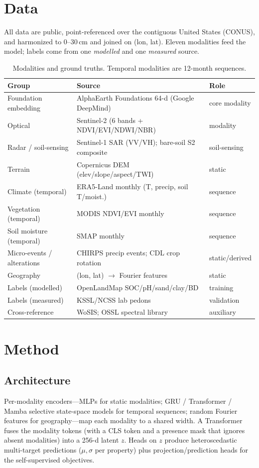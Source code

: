 \documentclass[11pt]{article}
\begin{document}
\section{Data}
All data are public, point-referenced over the contiguous United States (CONUS), and
harmonized to 0--30\,cm and joined on (lon, lat). Eleven modalities feed the model;
labels come from one \emph{modelled} and one \emph{measured} source.

\begin{table}[H]\centering\small
\caption{Modalities and ground truths. Temporal modalities are 12-month sequences.}
\begin{tabular}{lll}
\toprule
Group & Source & Role \\
\midrule
Foundation embedding & AlphaEarth Foundations 64-d (Google DeepMind) & core modality \\
Optical & Sentinel-2 (6 bands + NDVI/EVI/NDWI/NBR) & modality \\
Radar / soil-sensing & Sentinel-1 SAR (VV/VH); bare-soil S2 composite & soil-sensing \\
Terrain & Copernicus DEM (elev/slope/aspect/TWI) & static \\
Climate (temporal) & ERA5-Land monthly (T, precip, soil T/moist.) & sequence \\
Vegetation (temporal) & MODIS NDVI/EVI monthly & sequence \\
Soil moisture (temporal) & SMAP monthly & sequence \\
Micro-events / alterations & CHIRPS precip events; CDL crop rotation & static/derived \\
Geography & (lon, lat) $\rightarrow$ Fourier features & static \\
\midrule
Labels (modelled) & OpenLandMap SOC/pH/sand/clay/BD & training \\
Labels (measured) & KSSL/NCSS lab pedons & validation \\
Cross-reference & WoSIS; OSSL spectral library & auxiliary \\
\bottomrule
\end{tabular}
\end{table}

\section{Method}
\subsection{Architecture}
Per-modality encoders---MLPs for static modalities; GRU / Transformer / Mamba
selective state-space models for temporal sequences; random Fourier features for
geography---map each modality to a shared width. A Transformer fuses the modality
tokens (with a CLS token and a presence mask that ignores absent modalities) into a
256-d latent $z$. Heads on $z$ produce heteroscedastic multi-target predictions
($\mu,\sigma$ per property) plus projection/prediction heads for the self-supervised
objectives.
\end{document}

